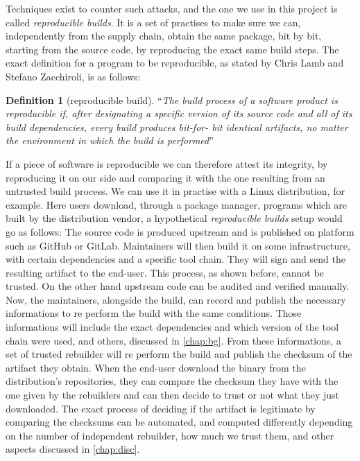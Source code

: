 \documentclass[a4paper,11pt,oneside]{report}
\theoremstyle{definition}
\newtheorem{definition}{Definition}[section]
\newcommand{\rb}{\emph{reproducible builds}\xspace}
\begin{document}
Techniques exist to counter such attacks, and the one we use in this project is
called \rb. It is a set of practises to make sure we can, independently from
the supply chain, obtain the same package, bit by bit, starting from the source
code, by reproducing the exact same build steps. The exact definition for a
program to be reproducible, as stated by Chris Lamb and Stefano Zacchiroli, is
as follows:

\begin{definition}[reproducible build]
\label{def:reprobuild}
``\emph{The build process of a software
product is reproducible if, after designating a
specific version of its source code and all of its
build dependencies, every build produces bit-for-
bit identical artifacts, no matter the environment
in which the build is performed}''~\cite{DBLP:journals/corr/abs-2104-06020}
\end{definition}

If a piece of software is reproducible we can therefore attest its integrity,
by reproducing it on our side and comparing it with the one resulting from an
untrusted build process. We can use it in practise with a Linux distribution,
for example. Here users download, through a package manager, programs which are
built by the distribution vendor, a hypothetical \rb setup would go as follows:
The source code is produced upstream and is published on platform such as
GitHub or GitLab. Maintainers will then build it on some infrastructure, with
certain dependencies and a specific tool chain. They will sign and send the
resulting artifact to the end-user. This process, as shown before, cannot be
trusted. On the other hand upstream code can be audited and verified manually.
Now, the maintainers, alongside the build, can record and publish the necessary
informations to re perform the build with the same conditions. Those
informations will include the exact dependencies and which version of the tool
chain were used, and others, discussed in \autoref{chap:bg}. From these
informations, a set of trusted rebuilder will re perform the build and publish
the checksum of the artifact they obtain. When the end-user download the binary
from the distribution's repositories, they can compare the checksum they have
with the one given by the rebuilders and can then decide to trust or not what
they just downloaded. The exact process of deciding if the artifact is
legitimate by comparing the checksums can be automated, and computed
differently depending on the number of independent rebuilder, how much we trust
them, and other aspects discussed in
\autoref{chap:disc}. 
\end{document}
